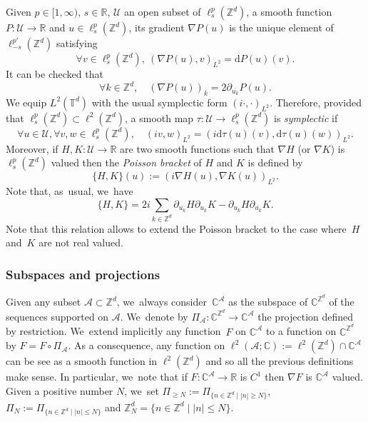 \documentclass[10pt]{amsart}
\theoremstyle{plain}
\theoremstyle{definition}
\newcommand{\1}{\mathbf{1}}
\begin{document}
Given $p\in[1,\infty)$, $s\in \mathbb{R}$, $\mathcal{U}$ an open subset of $\ell^p_s(\mathbb{Z}^d) $, a smooth function $P :\mathcal{U} \to \mathbb{R}$ and $u\in \ell^p_s(\mathbb{Z}^d)$, its gradient $\nabla P(u)$ is the unique element of $\ell^{p'}_{-s}(\mathbb{Z}^d)$ satisfying
\[
\forall v\in \ell^p_s(\mathbb{Z}^d), \ (\nabla P(u),v)_{L^2} = \mathrm{d}P(u)(v).
\]
It can be checked that
\begin{equation}
\label{eq:formula_grad}
\forall k \in \mathbb{Z}^d, \quad (\nabla P(u))_k = 2\partial_{\overline{u_k}} P(u).
\end{equation}
We equip $L^2(\mathbb{T}^d)$ with the usual symplectic form $(i\cdot,\cdot)_{L^2}$. Therefore, provided that $\ell^p_s(\mathbb{Z}^d) \subset \ell^2(\mathbb{Z}^d)$, a smooth map $\tau : \mathcal{U} \to \ell^p_s(\mathbb{Z}^d)$ is \emph{symplectic} if
\[
\forall u \in \mathcal{U}, \forall v,w \in \ell^p_s(\mathbb{Z}^d), \quad (iv,w)_{L^2} = (i\mathrm{d}\tau(u)(v),\mathrm{d}\tau(u)(w))_{L^2}.
\]
Moreover, if $H,K : \mathcal{U} \to \mathbb{R}$ are two smooth functions such that $\nabla H$ (or $\nabla K$) is $ \ell^p_s(\mathbb{Z}^d)$ valued then the \emph{Poisson bracket} of $H$ and $K$ is defined by
\[
\{ H,K\}(u):= (i \nabla H(u),\nabla K(u))_{L^2}.
\]
Note that, as~usual, we~have
\begin{equation}
\label{eq:pois-brak}
\{ H,K\}
=2i \sum_{k\in \mathbb{Z}^d} \partial_{\overline{u_k}}H \partial_{u_k} K - \partial_{u_k}H \partial_{\overline{u_k}} K.
\end{equation}
Note that this relation allows to extend the Poisson bracket to the case where~$H$ and~$K$ are not real valued.

\subsubsection{Subspaces and projections}
Given any subset $\mathcal{A} \subset \mathbb{Z}^d$, we~always consider~$\mathbb{C}^{\mathcal{A}}$ as the subspace of $\mathbb{C}^{\mathbb{Z}^d}$ of the sequences supported on $\mathcal{A}$. We~denote by $\Pi_{\mathcal{A}} : \mathbb{C}^{\mathbb{Z}^d} \to \mathbb{C}^{\mathcal{A}}$ the projection defined by restriction. We~extend implicitly any function~$F$ on $\mathbb{C}^{\mathcal{A}}$ to a function on $\mathbb{C}^{\mathbb{Z}^d}$ by $F=F\circ \Pi_{\mathcal{A}}$. As a consequence, any function on $\ell^2(\mathcal{A};\mathbb{C}):=\ell^2(\mathbb{Z}^d) \cap \mathbb{C}^{\mathcal{A}}$ can be see as a smooth function in $\ell^2(\mathbb{Z}^d)$ and so all the previous definitions make sense. In particular, we~note that if $F : \mathbb{C}^{\mathcal{A}} \to \mathbb{R} $ is $C^1$ then $\nabla F$ is $\mathbb{C}^{\mathcal{A}}$ valued. Given a positive number $N$, we~set $\Pi_{\geq N} := \Pi_{ \{ n \in \mathbb{Z}^d \mid |n| \geq N \} }$, $\Pi_{N} := \Pi_{ \{ n \in \mathbb{Z}^d \mid |n| \leq N \} }$ and $\mathbb{Z}^d_N = \{n \in \mathbb{Z}^d \mid |n| \leq N \}$.
\end{document}
